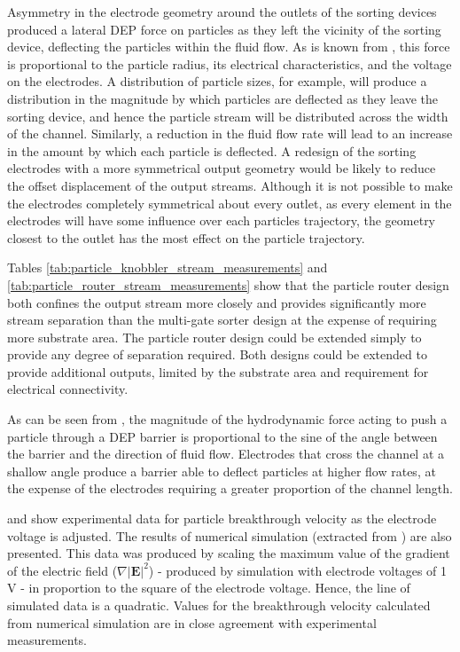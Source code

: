 Asymmetry in the electrode geometry around the outlets of the sorting devices produced a lateral DEP force on particles as they left the vicinity of the sorting device, deflecting the particles within the fluid flow. As is known from , this force is proportional to the particle radius, its electrical characteristics, and the voltage on the electrodes. A distribution of particle sizes, for example, will produce a distribution in the magnitude by which particles are deflected as they leave the sorting device, and hence the particle stream will be distributed across the width of the channel. Similarly, a reduction in the fluid flow rate will lead to an increase in the amount by which each particle is deflected. A redesign of the sorting electrodes with a more symmetrical output geometry would be likely to reduce the offset displacement of the output streams. Although it is not possible to make the electrodes completely symmetrical about every outlet, as every element in the electrodes will have some influence over each particles trajectory, the geometry closest to the outlet has the most effect on the particle trajectory.

Tables \ref{tab:particle_knobbler_stream_measurements} and \ref{tab:particle_router_stream_measurements} show that the particle router design both confines the output stream more closely and provides significantly more stream separation than the multi-gate sorter design at the expense of requiring more substrate area. The particle router design could be extended simply to provide any degree of separation required. Both designs could be extended to provide additional outputs, limited by the substrate area and requirement for electrical connectivity.

As can be seen from , the magnitude of the hydrodynamic force acting to push a particle through a DEP barrier is proportional to the sine of the angle between the barrier and the direction of fluid flow. Electrodes that cross the channel at a shallow angle produce a barrier able to deflect particles at higher flow rates, at the expense of the electrodes requiring a greater proportion of the channel length.

 and  show experimental data for particle breakthrough velocity as the electrode voltage is adjusted. The results of numerical simulation (extracted from ) are also presented. This data was produced by scaling the maximum value of the gradient of the electric field ($\nabla \left | \textbf{E} \right | ^{2}$) - produced by simulation with electrode voltages of 1 V - in proportion to the square of the electrode voltage. Hence, the line of simulated data is a quadratic. Values for the breakthrough velocity calculated from numerical simulation are in close agreement with experimental measurements.

